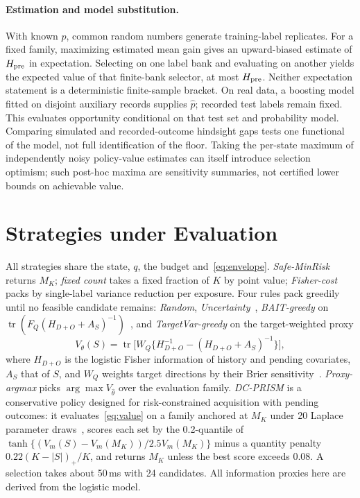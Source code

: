 \documentclass[runningheads]{llncs}
\begin{document}
\paragraph{Estimation and model substitution.} With known $p$, common random numbers generate training-label replicates. For a fixed family, maximizing estimated mean gain gives an upward-biased estimate of $H_{\rm pre}$ in expectation. Selecting on one label bank and evaluating on another yields the expected value of that finite-bank selector, at most $H_{\rm pre}$. Neither expectation statement is a deterministic finite-sample bracket. On real data, a boosting model fitted on disjoint auxiliary records supplies $\hat p$; recorded test labels remain fixed. This evaluates opportunity conditional on that test set and probability model. Comparing simulated and recorded-outcome hindsight gaps tests one functional of the model, not full identification of the floor. Taking the per-state maximum of independently noisy policy-value estimates can itself introduce selection optimism; such post-hoc maxima are sensitivity summaries, not certified lower bounds on achievable value.

\section{Strategies under Evaluation}
\label{sec:policy}
All strategies share the state, $q$, the budget and~\eqref{eq:envelope}. \emph{Safe-MinRisk} returns $M_K$; \emph{fixed count} takes a fixed fraction of $K$ by point value; \emph{Fisher-cost} packs by single-label variance reduction per exposure. Four rules pack greedily until no feasible candidate remains: \emph{Random}, \emph{Uncertainty}~\cite{lewis1994sequential}, \emph{BAIT-greedy} on $\operatorname{tr}(F_Q(H_{D+O}+A_S)^{-1})$~\cite{ash2021fishing}, and \emph{TargetVar-greedy} on the target-weighted proxy
\begin{equation}
 V_\theta(S)=\operatorname{tr}\big[W_Q\{H_{D+O}^{-1}-(H_{D+O}+A_S)^{-1}\}\big],\label{eq:value}
\end{equation}
where $H_{D+O}$ is the logistic Fisher information of history and pending covariates, $A_S$ that of $S$, and $W_Q$ weights target directions by their Brier sensitivity~\cite{yu2006transductive,bickfordsmith2023prediction}. \emph{Proxy-argmax} picks $\arg\max V_{\hat\theta}$ over the evaluation family. \emph{DC-PRISM} is a conservative policy designed for risk-constrained acquisition with pending outcomes: it evaluates~\eqref{eq:value} on a family anchored at $M_K$ under 20 Laplace parameter draws~\cite{mackay1992practical}, scores each set by the 0.2-quantile of $\tanh\{(V_m(S)-V_m(M_K))/2.5V_m(M_K)\}$ minus a quantity penalty $0.22(K-|S|)_+/K$, and returns $M_K$ unless the best score exceeds $0.08$. A selection takes about 50\,ms with 24 candidates. All information proxies here are derived from the logistic model.
\end{document}
